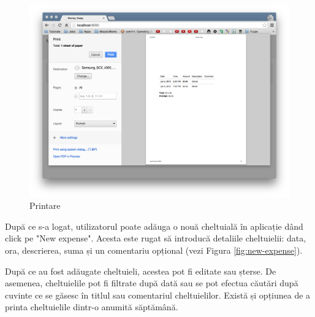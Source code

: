 \begin{figure}
  \includegraphics[width=1\textwidth]{./chap5-files/print_weekly2}
  \caption{Printare}
\end{figure}

După ce s-a logat, utilizatorul poate adăuga o nouă cheltuială în aplicație
dând click pe "New expense". Acesta este rugat să introducă detaliile
cheltuielii: data, ora, descrierea, suma și un comentariu opțional
(vezi Figura \ref{fig:new-expense}).

După ce au fost adăugate cheltuieli, acestea pot fi editate sau șterse.
De asemenea, cheltuielile pot fi filtrate după dată sau se pot
efectua căutări după cuvinte ce se găsesc în titlul sau comentariul
cheltuielilor. Există și opțiunea de a printa cheltuielile dintr-o
anumită săptămână.


